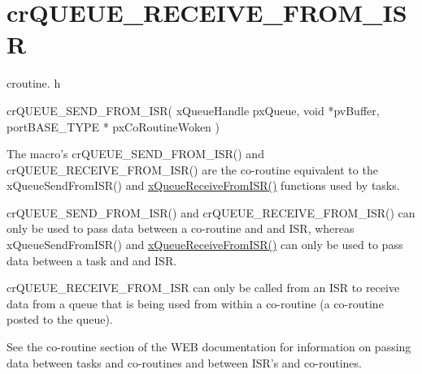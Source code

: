 \hypertarget{group__cr_q_u_e_u_e___r_e_c_e_i_v_e___f_r_o_m___i_s_r}{\section{cr\-Q\-U\-E\-U\-E\-\_\-\-R\-E\-C\-E\-I\-V\-E\-\_\-\-F\-R\-O\-M\-\_\-\-I\-S\-R}
\label{group__cr_q_u_e_u_e___r_e_c_e_i_v_e___f_r_o_m___i_s_r}
}
croutine. h 
\begin{DoxyPre}
  crQUEUE\_SEND\_FROM\_ISR(
                            xQueueHandle pxQueue,
                            void *pvBuffer,
                            portBASE\_TYPE * pxCoRoutineWoken
                       )\end{DoxyPre}


The macro's cr\-Q\-U\-E\-U\-E\-\_\-\-S\-E\-N\-D\-\_\-\-F\-R\-O\-M\-\_\-\-I\-S\-R() and cr\-Q\-U\-E\-U\-E\-\_\-\-R\-E\-C\-E\-I\-V\-E\-\_\-\-F\-R\-O\-M\-\_\-\-I\-S\-R() are the co-\/routine equivalent to the x\-Queue\-Send\-From\-I\-S\-R() and \hyperlink{_common_2_libraries_2_free_r_t_o_s_2_source_2include_2queue_8h_a1e861f8eb3f7f56d10fc626fd76ca3a9}{x\-Queue\-Receive\-From\-I\-S\-R()} functions used by tasks.

cr\-Q\-U\-E\-U\-E\-\_\-\-S\-E\-N\-D\-\_\-\-F\-R\-O\-M\-\_\-\-I\-S\-R() and cr\-Q\-U\-E\-U\-E\-\_\-\-R\-E\-C\-E\-I\-V\-E\-\_\-\-F\-R\-O\-M\-\_\-\-I\-S\-R() can only be used to pass data between a co-\/routine and and I\-S\-R, whereas x\-Queue\-Send\-From\-I\-S\-R() and \hyperlink{_common_2_libraries_2_free_r_t_o_s_2_source_2include_2queue_8h_a1e861f8eb3f7f56d10fc626fd76ca3a9}{x\-Queue\-Receive\-From\-I\-S\-R()} can only be used to pass data between a task and and I\-S\-R.

cr\-Q\-U\-E\-U\-E\-\_\-\-R\-E\-C\-E\-I\-V\-E\-\_\-\-F\-R\-O\-M\-\_\-\-I\-S\-R can only be called from an I\-S\-R to receive data from a queue that is being used from within a co-\/routine (a co-\/routine posted to the queue).

See the co-\/routine section of the W\-E\-B documentation for information on passing data between tasks and co-\/routines and between I\-S\-R's and co-\/routines.


